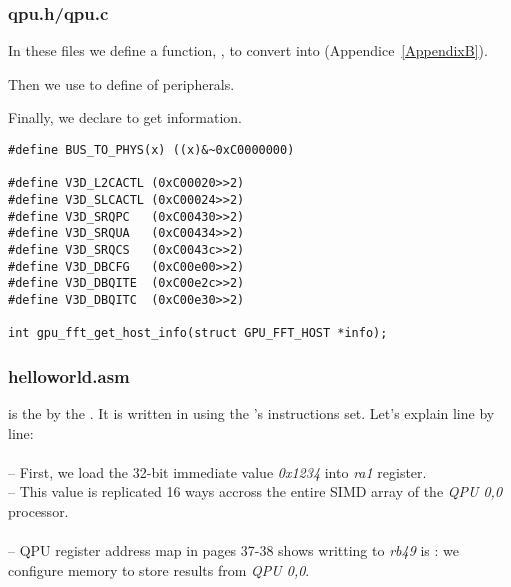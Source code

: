 \subsubsection{qpu.h/qpu.c}

In these files we define a  function, , to convert  into  (Appendice~\ref{AppendixB}).

Then we use  to define  of \vc{} peripherals.

Finally, we declare  to get \rasp{} information.


\begin{lstlisting}
#define BUS_TO_PHYS(x) ((x)&~0xC0000000)

#define V3D_L2CACTL (0xC00020>>2)
#define V3D_SLCACTL (0xC00024>>2)
#define V3D_SRQPC   (0xC00430>>2)
#define V3D_SRQUA   (0xC00434>>2)
#define V3D_SRQCS   (0xC0043c>>2)
#define V3D_DBCFG   (0xC00e00>>2)
#define V3D_DBQITE  (0xC00e2c>>2)
#define V3D_DBQITC  (0xC00e30>>2)

int gpu_fft_get_host_info(struct GPU_FFT_HOST *info);
\end{lstlisting}


\subsubsection{helloworld.asm}

 is the  by the \vc. It is written in  using the \vc{}'s instructions set. Let's explain line by line:\\

\\
-- First, we load the 32-bit immediate value \emph{0x1234} into \emph{ra1} register.\\
-- This value is replicated 16 ways accross the entire SIMD array of the \emph{QPU 0,0} processor.\\

\\
-- QPU register address map in \parencite{refVC} pages 37-38 shows writting to \emph{rb49} is : we configure  memory to store results from \emph{QPU 0,0}.\\

